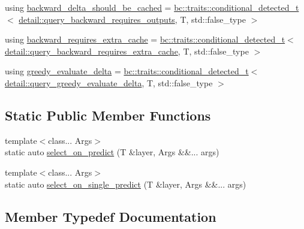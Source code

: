 \begin{DoxyCompactItemize}
\item 
using \hyperlink{structbc_1_1nn_1_1layer__traits_a20815b34dc94e460aabd4eba8ad9baec}{backward\+\_\+delta\+\_\+should\+\_\+be\+\_\+cached} = \hyperlink{namespacebc_1_1traits_a1a6d378947ec32acd457890854bcd592}{bc\+::traits\+::conditional\+\_\+detected\+\_\+t}$<$ \hyperlink{namespacebc_1_1nn_1_1detail_ad187de638865a7fbfe0e3c1db1511e4a}{detail\+::query\+\_\+backward\+\_\+requires\+\_\+outputs}, T, std\+::false\+\_\+type $>$
\item 
using \hyperlink{structbc_1_1nn_1_1layer__traits_adb08bd29c79f30ddfbe4cc256ff5c822}{backward\+\_\+requires\+\_\+extra\+\_\+cache} = \hyperlink{namespacebc_1_1traits_a1a6d378947ec32acd457890854bcd592}{bc\+::traits\+::conditional\+\_\+detected\+\_\+t}$<$ \hyperlink{namespacebc_1_1nn_1_1detail_a1599626f3fdc7ffbe459d9abf8325465}{detail\+::query\+\_\+backward\+\_\+requires\+\_\+extra\+\_\+cache}, T, std\+::false\+\_\+type $>$
\item 
using \hyperlink{structbc_1_1nn_1_1layer__traits_a07a975e03a39e8b1c9040f970e5efe1c}{greedy\+\_\+evaluate\+\_\+delta} = \hyperlink{namespacebc_1_1traits_a1a6d378947ec32acd457890854bcd592}{bc\+::traits\+::conditional\+\_\+detected\+\_\+t}$<$ \hyperlink{namespacebc_1_1nn_1_1detail_aee17a95f5bdf1a2903f755a7de7ac632}{detail\+::query\+\_\+greedy\+\_\+evaluate\+\_\+delta}, T, std\+::false\+\_\+type $>$
\end{DoxyCompactItemize}
\subsection*{Static Public Member Functions}
\begin{DoxyCompactItemize}
\item 
{\footnotesize template$<$class... Args$>$ }\\static auto \hyperlink{structbc_1_1nn_1_1layer__traits_abcbd25ae68c8b16363005cee09696142}{select\+\_\+on\+\_\+predict} (T \&layer, Args \&\&... args)
\item 
{\footnotesize template$<$class... Args$>$ }\\static auto \hyperlink{structbc_1_1nn_1_1layer__traits_a5810b5f90ef816acd95955372fe7223f}{select\+\_\+on\+\_\+single\+\_\+predict} (T \&layer, Args \&\&... args)
\end{DoxyCompactItemize}


\subsection{Member Typedef Documentation}
\mbox{\label{structbc_1_1nn_1_1layer__traits_afbe9ab9133f903efde7f3d307836d489}} 
